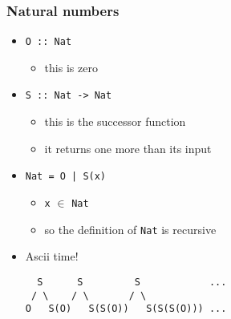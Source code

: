 \documentclass{beamer}
\begin{document}
\begin{frame}[fragile]
    \frametitle {Natural numbers}
\begin{itemize}
    \item \verb?O :: Nat?
    \begin{itemize}
        \item this is zero
    \end{itemize}

    \item \verb?S :: Nat -> Nat?
    \begin{itemize}
        \item this is the successor function
        \item it returns one more than its input
    \end{itemize}

    \item \verb?Nat = O | S(x)?
    \begin{itemize}
        \item \verb?x? $\in$ \verb?Nat?
        \item so the definition of \verb?Nat? is recursive
    \end{itemize}

    \item Ascii time!
\begin{verbatim}
  S      S         S            ...
 / \    / \       / \
O   S(O)   S(S(O))   S(S(S(O))) ...
\end{verbatim}

    \end{itemize}
\end{frame}
\end{document}
